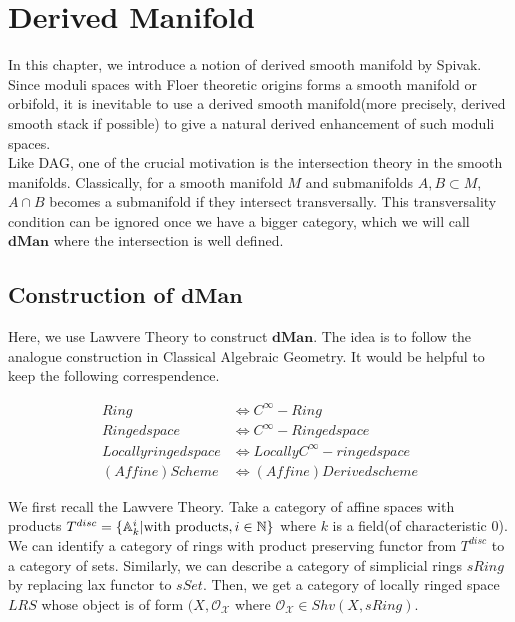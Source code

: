 \chapter{Derived Manifold}
In this chapter, we introduce a notion of derived smooth manifold by Spivak. Since moduli spaces with Floer theoretic origins forms a smooth manifold or orbifold, it is inevitable to use a derived smooth manifold(more precisely, derived smooth stack if possible) to give a natural derived enhancement of such moduli spaces. \\

Like DAG, one of the crucial motivation is the intersection theory in the smooth manifolds. Classically, for a smooth manifold $M$ and submanifolds $A, B \subset M$, $A \cap B$ becomes a submanifold if they intersect transversally. This transversality condition can be ignored once we have a bigger category, which we will call $\textbf{dMan}$ where the intersection is well defined. 

\section{Construction of $\textbf{dMan}$}
Here, we use Lawvere Theory to construct $\textbf{dMan}$. The idea is to follow the analogue construction in Classical Algebraic Geometry. It would be helpful to keep the following correspendence.

\begin{align*}
    Ring &
    \Longleftrightarrow C^{\infty}-Ring \\
    Ringed space &
    \Longleftrightarrow  C^{\infty}-Ringed space \\
    Locally ringed space &
    \Longleftrightarrow 
    Locally C^{\infty}-ringed space \\
    (Affine) Scheme &
    \Longleftrightarrow 
    (Affine) Derived scheme
\end{align*}

We first recall the Lawvere Theory. Take a category of affine spaces with products $T^{disc}=\{\mathbb{A}^i_k | \text{with products}, i \in \mathbb N\}$ where $k$ is a field(of characteristic 0). We can identify a category of rings with product preserving functor from $T^{disc}$ to a category of sets. Similarly, we can describe a category of simplicial rings $sRing$ by replacing lax functor to $sSet$. Then, we get a category of locally ringed space $LRS$ whose object is of form $(X, \mathcal{O_X}$ where $\mathcal{O_X} \in Shv(X, sRing)$.

